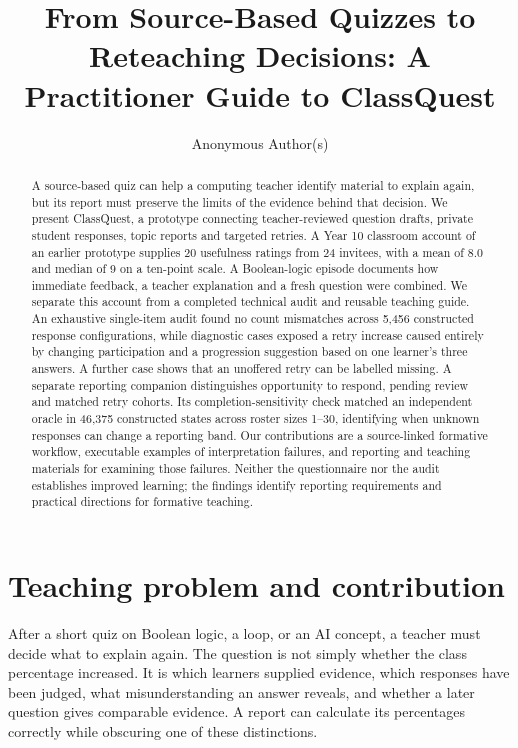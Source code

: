 
\title[From Source-Based Quizzes to Reteaching Decisions]{From Source-Based Quizzes to Reteaching Decisions: A Practitioner Guide to ClassQuest}
\author{Anonymous Author(s)}
\begin{abstract}
A source-based quiz can help a computing teacher identify material to explain again, but its report must preserve the limits of the evidence behind that decision. We present ClassQuest, a prototype connecting teacher-reviewed question drafts, private student responses, topic reports and targeted retries. A Year 10 classroom account of an earlier prototype supplies 20 usefulness ratings from 24 invitees, with a mean of 8.0 and median of 9 on a ten-point scale. A Boolean-logic episode documents how immediate feedback, a teacher explanation and a fresh question were combined. We separate this account from a completed technical audit and reusable teaching guide. An exhaustive single-item audit found no count mismatches across 5,456 constructed response configurations, while diagnostic cases exposed a retry increase caused entirely by changing participation and a progression suggestion based on one learner's three answers. A further case shows that an unoffered retry can be labelled missing. A separate reporting companion distinguishes opportunity to respond, pending review and matched retry cohorts. Its completion-sensitivity check matched an independent oracle in 46,375 constructed states across roster sizes 1--30, identifying when unknown responses can change a reporting band. Our contributions are a source-linked formative workflow, executable examples of interpretation failures, and reporting and teaching materials for examining those failures. Neither the questionnaire nor the audit establishes improved learning; the findings identify reporting requirements and practical directions for formative teaching.
\end{abstract}
\maketitle

\section{Teaching problem and contribution}
After a short quiz on Boolean logic, a loop, or an AI concept, a teacher must decide what to explain again. The question is not simply whether the class percentage increased. It is which learners supplied evidence, which responses have been judged, what misunderstanding an answer reveals, and whether a later question gives comparable evidence. A report can calculate its percentages correctly while obscuring one of these distinctions.

